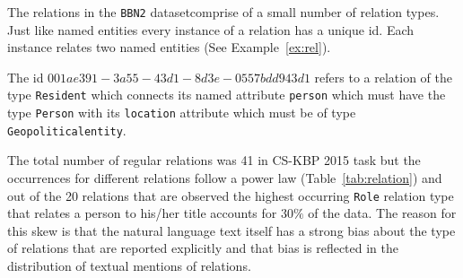 \documentclass[paper=a4,fontsize=11pt]{scrartcl}
\newcommand{\Tabref}[1]{Table~\ref{#1}}
\newcommand{\Exref}[1]{Example~\ref{#1}}
\numberwithin{equation}{section}    %
\numberwithin{figure}{section}      %
\numberwithin{table}{section}       %
\newcommand{\dataset}[0]{\texttt{BBN2} dataset\xspace{}}
\newcommand{\task}{CS-KBP 2015 task\xspace{}}
\begin{document}
The relations in the \dataset comprise of a small number of relation types.
Just like named entities every instance of a relation has a unique id.
Each instance relates two named entities (See \Exref{ex:rel}).
\begin{example}\label{ex:rel}
  The id $001ae391-3a55-43d1-8d3e-0557bdd943d1$ refers to a relation of the
type \texttt{Resident} which connects its named attribute \texttt{person}
which must have the type \texttt{Person}
with its \texttt{location} attribute which must be of type
\texttt{Geopoliticalentity}.
\end{example}
The total number of regular relations was 41 in \task
but the occurrences for different relations follow a power law
(\Tabref{tab:relation}) and  out of the 20 relations that are observed the
highest occurring \texttt{Role} relation type
that relates a person to his/her title accounts for $30\%$ of the data.
The reason for this skew is that the
natural language text itself has a strong bias about the type of relations that are
reported explicitly and that bias is reflected in the distribution of textual mentions
of relations.
\end{document}
